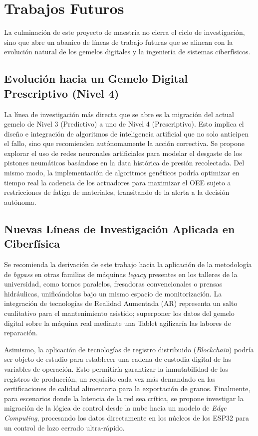 \section{Trabajos Futuros}

La culminación de este proyecto de maestría no cierra el ciclo de investigación, sino que abre un abanico de líneas de trabajo futuras que se alinean con la evolución natural de los gemelos digitales y la ingeniería de sistemas ciberfísicos.

\subsection{Evolución hacia un Gemelo Digital Prescriptivo (Nivel 4)}
La línea de investigación más directa que se abre es la migración del actual gemelo de Nivel 3 (Predictivo) a uno de Nivel 4 (Prescriptivo). Esto implica el diseño e integración de algoritmos de inteligencia artificial que no solo anticipen el fallo, sino que recomienden autónomamente la acción correctiva. Se propone explorar el uso de redes neuronales artificiales para modelar el desgaste de los pistones neumáticos basándose en la data histórica de presión recolectada. Del mismo modo, la implementación de algoritmos genéticos podría optimizar en tiempo real la cadencia de los actuadores para maximizar el OEE sujeto a restricciones de fatiga de materiales, transitando de la alerta a la decisión autónoma.

\subsection{Nuevas Líneas de Investigación Aplicada en Ciberfísica}
Se recomienda la derivación de este trabajo hacia la aplicación de la metodología de \textit{bypass} en otras familias de máquinas \textit{legacy} presentes en los talleres de la universidad, como tornos paralelos, fresadoras convencionales o prensas hidráulicas, unificándolas bajo un mismo espacio de monitorización. La integración de tecnologías de Realidad Aumentada (AR) representa un salto cualitativo para el mantenimiento asistido; superponer los datos del gemelo digital sobre la máquina real mediante una Tablet agilizaría las labores de reparación.

Asimismo, la aplicación de tecnologías de registro distribuido (\textit{Blockchain}) podría ser objeto de estudio para establecer una cadena de custodia digital de las variables de operación. Esto permitiría garantizar la inmutabilidad de los registros de producción, un requisito cada vez más demandado en las certificaciones de calidad alimentaria para la exportación de granos. Finalmente, para escenarios donde la latencia de la red sea crítica, se propone investigar la migración de la lógica de control desde la nube hacia un modelo de \textit{Edge Computing}, procesando los datos directamente en los núcleos de los ESP32 para un control de lazo cerrado ultra-rápido.

